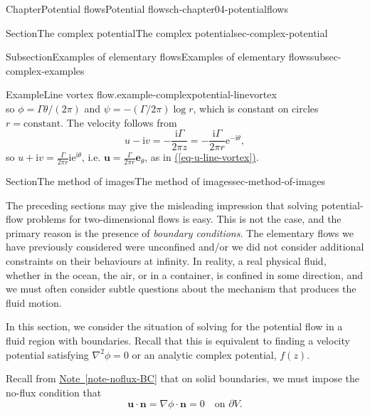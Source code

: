 \documentclass[oneside,10pt,]{book}
\newcommand{\xreffont}{\relax}
\numberwithin{equation}{section}
\newcommand{\e}{\mathrm{e}}
\newcommand{\im}{\mathrm{i}}
\newcommand{\be}{\boldsymbol{e}}
\newcommand{\bn}{\boldsymbol{n}}
\newcommand{\bu}{\boldsymbol{u}}
\begin{document}
\begin{chapterptx}{Chapter}{Potential flows}{}{Potential flows}{}{}{ch-chapter04-potentialflows}
\begin{sectionptx}{Section}{The complex potential}{}{The complex potential}{}{}{sec-complex-potential}
\begin{subsectionptx}{Subsection}{Examples of elementary flows}{}{Examples of elementary flows}{}{}{subsec-complex-examples}
\begin{example}{Example}{Line vortex flow.}{example-complexpotential-linevortex}
\begin{equation*}
\end{equation*}
so \(\phi = \Gamma\theta/(2\pi)\) and \(\psi = -(\Gamma/2\pi) \log r\), which is constant on circles \(r = \textrm{constant}\). The velocity follows from%
\begin{equation*}
u - \im v = -\frac{\im\Gamma}{2\pi z} = -\frac{\im\Gamma}{2\pi r}\e^{-\im\theta},
\end{equation*}
so \(u + \im v = \frac{\Gamma}{2\pi r}\im\e^{\im\theta}\), i.e. \(\bu = \frac{\Gamma}{2\pi r}\be_\theta\), as in \hyperref[eq-u-line-vortex]{({\xreffont\ref{eq-u-line-vortex}})}.%
\end{example}
\end{subsectionptx}
\end{sectionptx}
%
%
\typeout{************************************************}
\typeout{************************************************}
%
\begin{sectionptx}{Section}{The method of images}{}{The method of images}{}{}{sec-method-of-images}
\begin{introduction}{}%
The preceding sections may give the misleading impression that solving potential-flow problems for two-dimensional flows is easy. This is not the case, and the primary reason is the presence of \emph{boundary conditions}. The elementary flows we have previously considered were unconfined and\slash{}or we did not consider additional constraints on their behaviours at infinity. In reality, a real physical fluid, whether in the ocean, the air, or in a container, is confined in some direction, and we must often consider subtle questions about the mechanism that produces the fluid motion.%
\par
In this section, we consider the situation of solving for the potential flow in a fluid region with boundaries. Recall that this is equivalent to finding a velocity potential satisfying \(\nabla^2 \phi = 0\) or an analytic complex potential, \(f(z)\).%
\par
Recall from \hyperref[note-noflux-BC]{Note~{\xreffont\ref{note-noflux-BC}}} that on solid boundaries, we must impose the no-flux condition that%
\begin{equation*}
\bu \cdot \bn = \nabla \phi \cdot \bn = 0 \quad \text{on $\partial V$}.
\end{equation*}
%
\end{introduction}%
%
%
\typeout{************************************************}
\typeout{************************************************}

\end{sectionptx}
\end{chapterptx}
\end{document}
